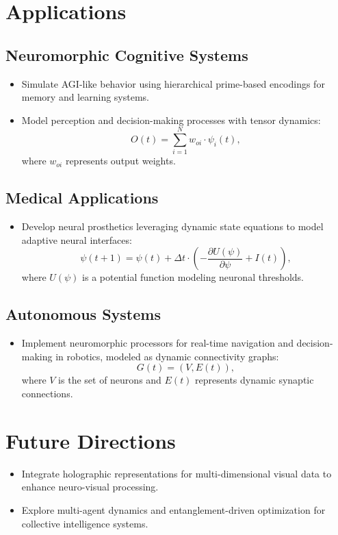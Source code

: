 \documentclass{article}
\theoremstyle{plain}
\begin{document}
\section{Applications}

\subsection{Neuromorphic Cognitive Systems}
\begin{itemize}
    \item Simulate AGI-like behavior using hierarchical prime-based encodings for memory and learning systems.
    \item Model perception and decision-making processes with tensor dynamics:
    \[
    O(t) = \sum_{i=1}^N w_{oi} \cdot \psi_i(t),
    \]
    where \(w_{oi}\) represents output weights.
\end{itemize}

\subsection{Medical Applications}
\begin{itemize}
    \item Develop neural prosthetics leveraging dynamic state equations to model adaptive neural interfaces:
    \[
    \psi(t+1) = \psi(t) + \Delta t \cdot \left(-\frac{\partial U(\psi)}{\partial \psi} + I(t)\right),
    \]
    where \(U(\psi)\) is a potential function modeling neuronal thresholds.
\end{itemize}

\subsection{Autonomous Systems}
\begin{itemize}
    \item Implement neuromorphic processors for real-time navigation and decision-making in robotics, modeled as dynamic connectivity graphs:
    \[
    G(t) = (V, E(t)),
    \]
    where \(V\) is the set of neurons and \(E(t)\) represents dynamic synaptic connections.
\end{itemize}

\section{Future Directions}
\begin{itemize}
    \item Integrate holographic representations for multi-dimensional visual data to enhance neuro-visual processing.
    \item Explore multi-agent dynamics and entanglement-driven optimization for collective intelligence systems.
\end{itemize}

\nocite{*}


\end{document}
